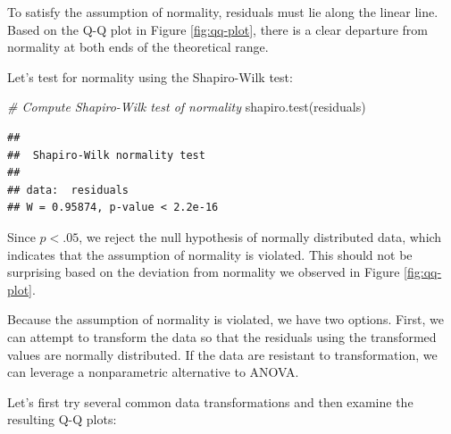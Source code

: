 \documentclass[
]{book}
\newenvironment{Shaded}{\begin{snugshade}}{\end{snugshade}}
\newcommand{\CommentTok}[1]{\textcolor[rgb]{0.56,0.35,0.01}{\textit{#1}}}
\newcommand{\FunctionTok}[1]{\textcolor[rgb]{0.00,0.00,0.00}{#1}}
\newcommand{\NormalTok}[1]{#1}
\begin{document}
To satisfy the assumption of normality, residuals must lie along the linear line. Based on the Q-Q plot in Figure \ref{fig:qq-plot}, there is a clear departure from normality at both ends of the theoretical range.

Let's test for normality using the Shapiro-Wilk test:

\begin{Shaded}
\begin{Highlighting}[]
\CommentTok{\# Compute Shapiro{-}Wilk test of normality}
\FunctionTok{shapiro.test}\NormalTok{(residuals)}
\end{Highlighting}
\end{Shaded}

\begin{verbatim}
## 
##  Shapiro-Wilk normality test
## 
## data:  residuals
## W = 0.95874, p-value < 2.2e-16
\end{verbatim}

Since \(p < .05\), we reject the null hypothesis of normally distributed data, which indicates that the assumption of normality is violated. This should not be surprising based on the deviation from normality we observed in Figure \ref{fig:qq-plot}.

Because the assumption of normality is violated, we have two options. First, we can attempt to transform the data so that the residuals using the transformed values are normally distributed. If the data are resistant to transformation, we can leverage a nonparametric alternative to ANOVA.

Let's first try several common data transformations and then examine the resulting Q-Q plots:
\end{document}
